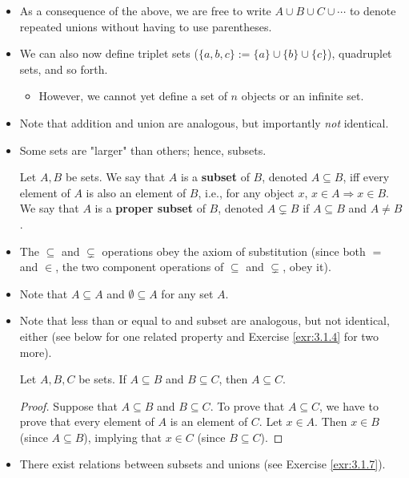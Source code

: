 \documentclass[../main.tex]{subfiles}
\begin{document}
\begin{itemize}
\begin{lem}
\begin{proof}
        \end{proof}
    \end{lem}
    \item As a consequence of the above, we are free to write $A\cup B\cup C\cup\cdots$ to denote repeated unions without having to use parentheses.
    \item We can also now define triplet sets ($\{a,b,c\}:=\{a\}\cup\{b\}\cup\{c\}$), quadruplet sets, and so forth.
    \begin{itemize}
        \item However, we cannot yet define a set of $n$ objects or an infinite set.
    \end{itemize}
    \item Note that addition and union are analogous, but importantly \emph{not} identical.
    \item Some sets are "larger" than others; hence, subsets.
    \begin{dfn}[Subsets]\label{dfn:subsets}
        Let $A,B$ be sets. We say that $A$ is a \textbf{subset} of $B$, denoted $A\subseteq B$, iff every element of $A$ is also an element of $B$, i.e., for any object $x$, $x\in A \Longrightarrow x\in B$. We say that $A$ is a \textbf{proper subset} of $B$, denoted $A\subsetneq B$ if $A\subseteq B$ and $A\neq B$.
    \end{dfn}
    \item The $\subseteq$ and $\subsetneq$ operations obey the axiom of substitution (since both $=$ and $\in$, the two component operations of $\subseteq$ and $\subsetneq$, obey it).
    \item Note that $A\subseteq A$ and $\emptyset\subseteq A$ for any set $A$.
    \item Note that less than or equal to and subset are analogous, but not identical, either (see below for one related property and Exercise \ref{exr:3.1.4} for two more).
    \begin{prp}\label{prp:subsetTransitive}
        Let $A,B,C$ be sets. If $A\subseteq B$ and $B\subseteq C$, then $A\subseteq C$.
        \begin{proof}
            Suppose that $A\subseteq B$ and $B\subseteq C$. To prove that $A\subseteq C$, we have to prove that every element of $A$ is an element of $C$. Let $x\in A$. Then $x\in B$ (since $A\subseteq B$), implying that $x\in C$ (since $B\subseteq C$).
        \end{proof}
    \end{prp}
    \item There exist relations between subsets and unions (see Exercise \ref{exr:3.1.7}).

\end{itemize}
\end{document}
